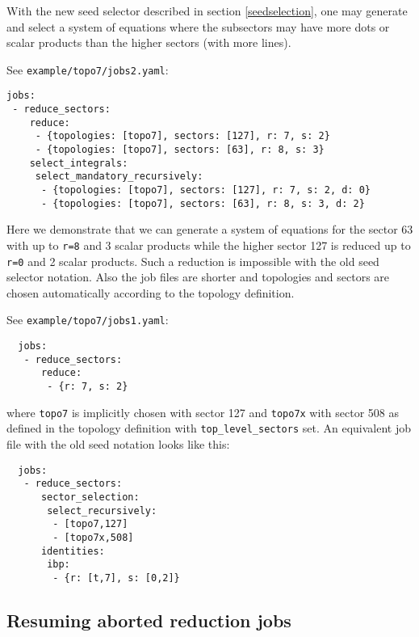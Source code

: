 \documentclass[a4paper,12pt]{article}
\begin{document}
With the new seed selector described in section \ref{seedselection}, one may
generate and select a system of equations where the subsectors may have more
dots or scalar products than the higher sectors (with more lines).

\medskip
\noindent
See \texttt{example/topo7/jobs2.yaml}:
\begin{verbatim}
jobs:
 - reduce_sectors:
    reduce:
     - {topologies: [topo7], sectors: [127], r: 7, s: 2}
     - {topologies: [topo7], sectors: [63], r: 8, s: 3}
    select_integrals:
     select_mandatory_recursively:
      - {topologies: [topo7], sectors: [127], r: 7, s: 2, d: 0}
      - {topologies: [topo7], sectors: [63], r: 8, s: 3, d: 2}
\end{verbatim}
Here we demonstrate that we can generate a system of equations for the sector 63
with up to \texttt{r=8} and 3 scalar products while the higher sector 127 is
reduced up to \texttt{r=0} and 2 scalar products.
Such a reduction is impossible with the old seed selector notation.
Also the job files are shorter and topologies and sectors are chosen
automatically according to the topology definition.

\medskip
\noindent
See \texttt{example/topo7/jobs1.yaml}:
\begin{verbatim}
  jobs:
   - reduce_sectors:
      reduce:
       - {r: 7, s: 2}
\end{verbatim}
where \texttt{topo7} is implicitly chosen with sector 127 and \texttt{topo7x}
with sector 508 as defined in the topology definition with
\texttt{top\_level\_sectors} set.
An equivalent job file with the old seed notation looks like this:
\begin{verbatim}
  jobs:
   - reduce_sectors:
      sector_selection:
       select_recursively:
        - [topo7,127]
        - [topo7x,508]
      identities:
       ibp:
        - {r: [t,7], s: [0,2]}
\end{verbatim}


\subsection{Resuming aborted reduction jobs}
\label{sect:checkpoints}
\end{document}
